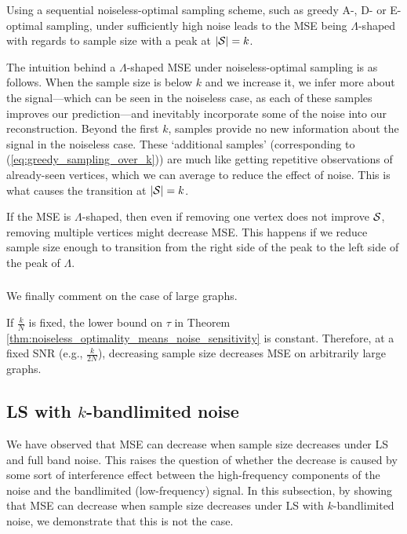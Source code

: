 \begin{remark}
\label{remark:LS_error_lambda_shaped}
Using a sequential noiseless-optimal sampling scheme, such as greedy A-, D- or E- optimal sampling, under sufficiently high noise leads to the MSE being $\Lambda$-shaped with regards to sample size with a peak at $|\mathcal{S}| = k$.
\end{remark}

The intuition behind a $\Lambda$-shaped MSE under noiseless-optimal sampling is as follows. When the sample size is below $k$ and we increase it, we infer more about the signal---which can be seen in the noiseless case, as each of these samples improves our prediction---and inevitably incorporate some of the noise into our reconstruction. Beyond the first $k$, samples provide no new information about the signal in the noiseless case. These `additional samples' (corresponding to (\ref{eq:greedy_sampling_over_k})) are much like getting repetitive observations of already-seen vertices, which we can average to reduce the effect of noise. This is what causes the transition at $|\mathcal{S}|=k$.
    
\begin{remark}
\label{remark:remove_multiple_nodes}
    If the MSE is $\Lambda$-shaped, then even if removing one vertex does not improve $\mathcal{S}$, removing multiple vertices might decrease MSE. This happens if we reduce sample size enough to transition from the right side of the peak to the left side of the peak of $\Lambda$.
\end{remark}

\subsubsection{}
We finally comment on the case of large graphs. 
{\color{black}
\begin{remark}
\label{rmk:LS_big_N}
If $\frac{k}{N}$ is fixed, the lower bound on $\tau$ in Theorem \ref{thm:noiseless_optimality_means_noise_sensitivity} is constant. Therefore, at a fixed SNR (e.g., $\frac{k}{2N}$), decreasing sample size decreases MSE on arbitrarily large graphs.
\end{remark}}



\subsection{LS with $k$-bandlimited noise}
\label{sec:LS_bandlimited}
We have observed that MSE can decrease when sample size decreases under LS and full band noise. This raises the question of whether the decrease is caused by some sort of interference effect between the high-frequency components of the noise and the bandlimited (low-frequency) signal. In this subsection, by showing that MSE can decrease when sample size decreases under LS with $k$-bandlimited noise, we demonstrate that this is not the case.

